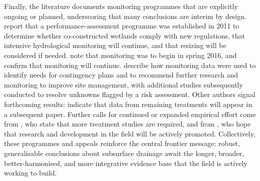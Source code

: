 Finally, the literature documents monitoring programmes that are explicitly ongoing or planned, underscoring that many conclusions are interim by design. \textcite{Tournebize2012} report that a performance-assessment programme was established in 2011 to determine whether co-constructed wetlands comply with new regulations, that intensive hydrological monitoring will continue, and that resizing will be considered if needed. \textcite{Kjaersgaard2016} note that monitoring was to begin in spring 2016, and \textcite{Ali2001} confirm that monitoring will continue. \textcite{Ohlendorf2002} describe how monitoring data were used to identify needs for contingency plans and to recommend further research and monitoring to improve site management, with additional studies subsequently conducted to resolve unknowns flagged by a risk assessment. Other authors signal forthcoming results: \textcite{Drury2014} indicate that data from remaining treatments will appear in a subsequent paper. Further calls for continued or expanded empirical effort come from \textcite{Rekha2011}, who state that more treatment studies are required, and from \textcite{Ogino2007}, who hope that research and development in the field will be actively promoted. Collectively, these programmes and appeals reinforce the central frontier message: robust, generalisable conclusions about subsurface drainage await the longer, broader, better-harmonised, and more integrative evidence base that the field is actively working to build.